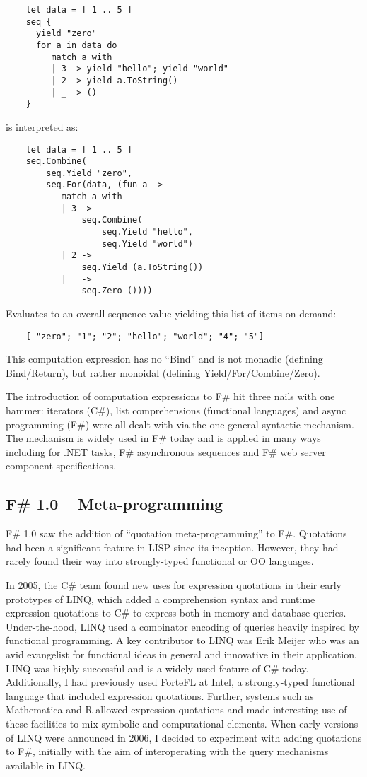 \documentclass[acmsmall,review]{acmart}\settopmatter{printfolios=true,printccs=false,printacmref=false}
\begin{document}
\begin{verbatim}
    let data = [ 1 .. 5 ]
    seq {
      yield "zero"
      for a in data do
         match a with
         | 3 -> yield "hello"; yield "world"
         | 2 -> yield a.ToString() 
         | _ -> () 
    }
\end{verbatim}
is interpreted as:
\begin{verbatim}
    let data = [ 1 .. 5 ]
    seq.Combine(
        seq.Yield "zero",
        seq.For(data, (fun a ->
           match a with
           | 3 -> 
               seq.Combine(
                   seq.Yield "hello", 
                   seq.Yield "world")
           | 2 ->
               seq.Yield (a.ToString())
           | _ ->
               seq.Zero ())))
\end{verbatim}
Evaluates to an overall sequence value yielding this list of items on-demand:
\begin{verbatim}
    [ "zero"; "1"; "2"; "hello"; "world"; "4"; "5"] 
\end{verbatim}
This computation expression has no “Bind” and is not monadic (defining Bind/Return), but rather monoidal (defining Yield/For/Combine/Zero).  

The introduction of computation expressions to F\# hit three nails with one hammer: iterators (C\#), list comprehensions (functional languages) and async programming (F\#) were all dealt with via the one general syntactic mechanism.  The mechanism is widely used in F\# today and is applied in many ways including for .NET tasks, F\# asynchronous sequences and F\# web server component specifications.

\subsection*{F\# 1.0 – Meta-programming}

F\# 1.0 saw the addition of “quotation meta-programming” to F\#.  Quotations had been a significant feature in LISP since its inception. However, they had rarely 
found their way into strongly-typed functional or OO languages.  


In 2005, the C\# team found new uses for expression quotations in their early prototypes of LINQ, which added a comprehension syntax and runtime expression quotations to C\# to express both in-memory and database queries. Under-the-hood, LINQ used a combinator encoding of queries heavily inspired by functional programming. A key contributor to LINQ was Erik Meijer who was an avid evangelist for functional ideas in general and innovative in their application. LINQ was highly successful and is a widely used feature of C\# today.  Additionally, I had previously used ForteFL at Intel, a strongly-typed functional language that included expression quotations.  Further, systems such as Mathematica and R allowed expression quotations and made interesting use of these facilities to mix symbolic and computational elements. When early versions of LINQ were announced in 2006, I decided to experiment with adding quotations to F\#, initially with the aim of interoperating with the query mechanisms available in LINQ.  
\end{document}
